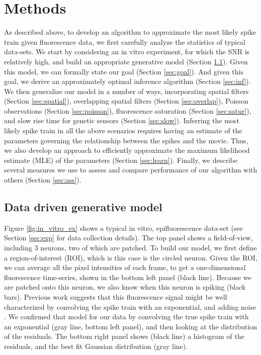 \newpage
\section{Methods} \label{sec:methods}

As described above, to develop an algorithm to approximate the most likely spike train given fluorescence data, we first carefully analyze the statistics of typical data-sets.  We start by considering an in vitro experiment, for which the SNR is relatively high, and build an appropriate generative model (Section \ref{sec:model}).  Given this model, we can formally state our goal (Section \ref{sec:goal}).  And given this goal, we derive an approximately optimal inference algorithm (Section \ref{sec:inf}).  We then generalize our model in a number of ways, incorporating spatial filters (Section \ref{sec:spatial}), overlapping spatial filters (Section \ref{sec:overlap}), Poisson observations (Section \ref{sec:poisson}), fluorescence saturation (Section \ref{sec:satur}), and slow rise time for genetic sensors (Section \ref{sec:slow}).  Inferring the most likely spike train in all the above scenarios requires having an estimate of the parameters governing the relationship between the spikes and the movie.  Thus, we also develop an approach to efficiently approximate the maximum likelihood estimate (MLE) of the parameters (Section \ref{sec:learn}).  Finally, we describe several measures we use to assess and compare performance of our algorithm with others (Section \ref{sec:ass}).    

\subsection{Data driven generative model} \label{sec:model}

Figure \ref{fig:in_vitro_ex} shows a typical in vitro, epifluorescence data-set (see Section \ref{sec:exp} for data collection details).  The top panel shows a field-of-view, including 3 neurons, two of which are patched.  To build our model, we first define a region-of-interest (ROI),  which is this case is the circled neuron.  Given the ROI, we can average all the pixel intensities of each frame, to get a one-dimensional fluorescence time-series, shown in the bottom left panel (black line).  Because we are patched onto this neuron, we also know when this neuron is spiking (black bars). 
Previous work suggests that this fluorescence signal might be well characterized by convolving the spike train with an exponential, and adding noise \cite{ImagingManual}.  We confirmed that model for our data by convolving the true spike train with an exponential (gray line, bottom left panel), and then looking at the distribution of the residuals.  The bottom right panel shows (black line) a histogram of the residuals, and the best fit Gaussian distribution (gray line).


